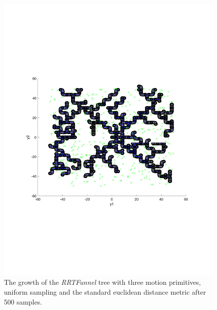 \begin{figure}
  \includegraphics[scale=.5]{figures/rrtfunnel/rrtfunnel-500samples}
  \caption{The growth of the \textit{RRTFunnel} tree with three motion
    primitives, uniform sampling and the standard euclidean distance metric
    after 500 samples.}
\end{figure}


